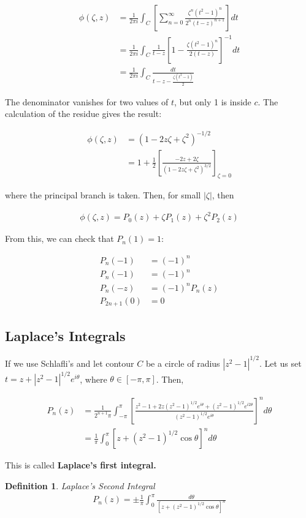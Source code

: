 \documentclass{article}
\theoremstyle{definition}
\newtheorem{definition}{Definition}[section]
\newcommand{\Def}[2]{
\begin{shaded*}
\begin{definition}{\textit{#1}}\\#2\end{definition}
\end{shaded*}
}
\begin{document}
\begin{align*}
\phi(\zeta,z) &= \frac{1}{2 \pi i} \int_C \left[\sum_{n=0}^\infty \frac{\zeta^n(t^2-1)^n}{2^n(t-z)^{n+1}}\right]dt \\ 
&= \frac{1}{2 \pi i} \int_C \frac{1}{t-z}\left[1 -  \frac{\zeta(t^2-1)^n}{2(t-z)}\right]^{-1}dt \\ 
&= \frac{1}{2 \pi i} \int_C \frac{dt}{t-z-\frac{\zeta(t^2-1)}{2}}
\end{align*}


The denominator vanishes for two values of $t$, but only 1 is inside $c$. The calculation of the residue gives the result:

\begin{align*}
\phi(\zeta,z)& = (1-2z \zeta + \zeta^2)^{-1/2} \\ 
&= 1 + \frac{1}{2} \left[\frac{-2z+2\zeta}{(1-2z\zeta + \zeta^2)^{3/2}} \right]_{\zeta=0}
\end{align*}

where the principal branch is taken. Then, for small $|\zeta|$, then 

\begin{align*}
\phi(\zeta,z) = P_0(z) + \zeta P_1(z) + \zeta^2 P_2(z)
\end{align*}

From this, we can check that $P_n(1)=1$:

\begin{align*}
P_n(-1)& = (-1)^n \\ 
P_n(-1) &= (-1)^n \\ 
P_n(-z) &= (-1)^nP_n(z) \\ 
P_{2n+1}(0) &= 0 
\end{align*}

\subsection{Laplace's Integrals}
If we use Schlafli's and let contour $C$ be a circle of radius $|z^2-1|^{1/2}$. Let us set $t=z + |z^2-1|^{1/2} e^{i\theta}$, where $\theta \in [-\pi, \pi]$. Then, 

\begin{align*}
P_n(z) &= \frac{1}{2^{n+1} \pi } \int_{-\pi}^\pi \left[\frac{z^2-1 + 2z(z^2-1)^{1/2} e^{i\theta} + (z^2-1)^{1/2} e^{i2\theta}}{(z^2-1)^{1/2} e^{i\theta}}\right]^n d\theta \\ 
&=\frac{1}{ \pi } \int_{0}^\pi [z +(z^2-1)^{1/2} \cos \theta ]^n d\theta 
\end{align*}

This is called \textbf{Laplace's first integral.}

\Def{Laplace's Second Integral}{
\begin{align*}
P_n(z) = \pm \frac{1}{\pi} \int_{0}^\pi \frac{d\theta}{ [z +(z^2-1)^{1/2} \cos \theta ]^n }
\end{align*}
}
\end{document}
